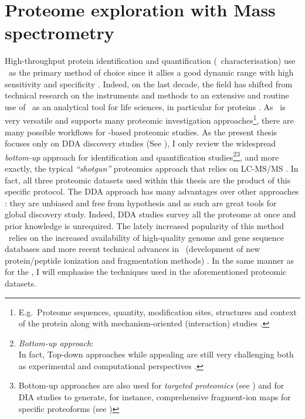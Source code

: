 \section{Proteome exploration with Mass spectrometry}

High-throughput protein identification and quantification (\ie\ characterisation)
use \ms\ as the primary method of choice since it allies a good dynamic range
with high sensitivity and specificity .
Indeed, on the last decade, the field has shifted from technical research on the
instruments and methods to an extensive and routine use of \ms\ as an analytical
tool for life sciences, in particular for proteins .
As \ms\ is very versatile and supports many proteomic investigation
approaches\footnote{E.g.\ Proteome sequences, quantity, modification sites,
structures and context of the protein along with mechanism-oriented
(interaction) studies .},
there are many possible workflows for \ms-based proteomic studies.
As the present thesis focuses only on \gls{DDA} discovery
studies (See ), I only review the widespread
\emph{bottom-up} approach for identification and quantification
studies\footnote{\emph{Bottom-up approach}: \\
In fact, \gls{Top-down} approaches while appealing
are still very challenging both as experimental and computational perspectives
.}\sepfootnote\footnote{Bottom-up approaches are
also used for \emph{targeted proteomics} (see ) and for
\gls{DIA} studies to generate, for instance, comprehensive fragment-ion maps for
specific proteoforms (see )}, and more exactly, the
typical \emph{\enquote{shotgun}} proteomics approach that
relies on \gls{LC-MS/MS} . In fact, all
three proteomic datasets used within this thesis are the product of this specific
protocol. The \gls{DDA} approach has many advantages over other approaches
: they are unbiased and free from hypothesis and as
such are great tools for global discovery study. Indeed, \gls{DDA} studies survey
all the proteome at once and prior knowledge is unrequired. The lately increased
popularity of this method%
~relies on the increased availability of high-quality genome and gene sequence
databases and more recent technical advances in \ms\ (development of new
protein/peptide ionization and fragmentation methods)
. In the same manner as for the \Rnaseq,
I will emphasise the techniques used in the aforementioned proteomic datasets.

